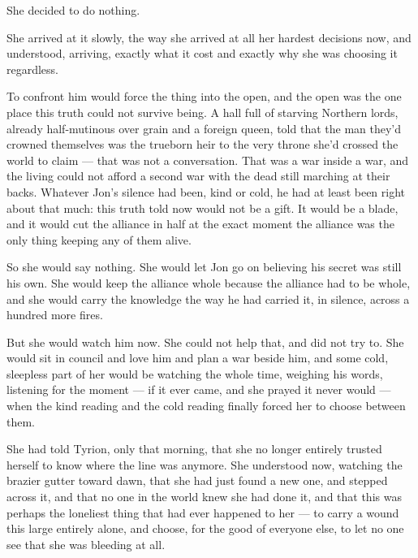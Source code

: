 \sceneBreak

She decided to do nothing.

She arrived at it slowly, the way she arrived at all her hardest decisions now, and understood, arriving, exactly what it cost and exactly why she was choosing it regardless.

To confront him would force the thing into the open, and the open was the one place this truth could not survive being. A hall full of starving Northern lords, already half-mutinous over grain and a foreign queen, told that the man they’d crowned themselves was the trueborn heir to the very throne she’d crossed the world to claim — that was not a conversation. That was a war inside a war, and the living could not afford a second war with the dead still marching at their backs. Whatever Jon’s silence had been, kind or cold, he had at least been right about that much: this truth told now would not be a gift. It would be a blade, and it would cut the alliance in half at the exact moment the alliance was the only thing keeping any of them alive.

So she would say nothing. She would let Jon go on believing his secret was still his own. She would keep the alliance whole because the alliance had to be whole, and she would carry the knowledge the way he had carried it, in silence, across a hundred more fires.

But she would watch him now. She could not help that, and did not try to. She would sit in council and love him and plan a war beside him, and some cold, sleepless part of her would be watching the whole time, weighing his words, listening for the moment — if it ever came, and she prayed it never would — when the kind reading and the cold reading finally forced her to choose between them.

She had told Tyrion, only that morning, that she no longer entirely trusted herself to know where the line was anymore. She understood now, watching the brazier gutter toward dawn, that she had just found a new one, and stepped across it, and that no one in the world knew she had done it, and that this was perhaps the loneliest thing that had ever happened to her — to carry a wound this large entirely alone, and choose, for the good of everyone else, to let no one see that she was bleeding at all.